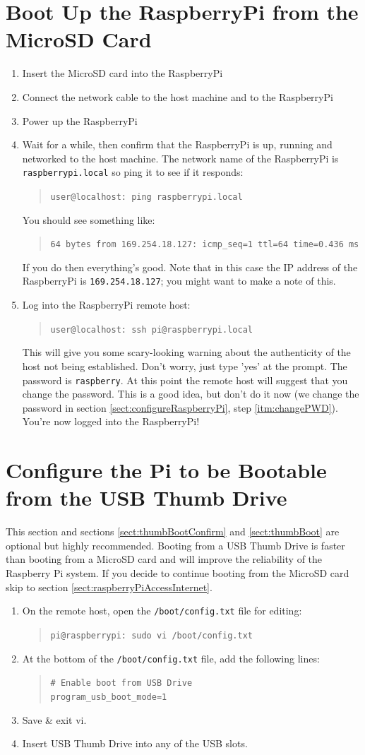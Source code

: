 \documentclass[11pt,oneside]{article}
\makeatletter
\newcommand{\localCommand}[1]{\begin{quote} \texttt{user@localhost: #1} \end{quote}}
\newcommand{\remoteCommandBeforeRename}[1]{\begin{quote} \texttt{pi@raspberrypi: #1} \end{quote}}
\newcommand{\xtermPartialOutput}[1]{\begin{verse} \texttt{#1} \end{verse}}
\makeatother
\begin{document}
\section{Boot Up the RaspberryPi from the MicroSD Card} \label{sect:bootRPIFromMSD}
\begin{enumerate}
	\item Insert the MicroSD card into the RaspberryPi
	\item Connect the network cable to the host machine and to the RaspberryPi
	\item Power up the RaspberryPi
	\item \label{itm:pingPISSDCard} Wait for a while, then confirm that the RaspberryPi is up, running and networked to the host machine.  The network name of the RaspberryPi
	is \texttt{raspberrypi.local} so ping it to see if it responds: \localCommand{ping raspberrypi.local}
	You should see something like:
	\xtermPartialOutput{64 bytes from 169.254.18.127: icmp\_seq=1 ttl=64 time=0.436 ms}
	If you do then everything's good.  Note that in this case the IP address of the RaspberryPi is \texttt{169.254.18.127}; you might want to make a note of this.
	\item Log into the RaspberryPi remote host: \localCommand{ssh pi@raspberrypi.local}
	This will give you some scary-looking warning about the authenticity of the host not being established.  Don't worry, just type 'yes' at the prompt.  The password is \texttt{raspberry}.
	At this point the remote host will suggest that you change the password.  This is a good idea, but don't do it now (we change the password in section \ref{sect:configureRaspberryPi},
	step \ref{itm:changePWD}).  You're now logged into the RaspberryPi!
\end{enumerate}

\section{Configure the Pi to be Bootable from the USB Thumb Drive} \label{sect:thumbBootConfigure}
This section and sections \ref{sect:thumbBootConfirm} and \ref{sect:thumbBoot} are optional but highly recommended.  Booting from a USB Thumb Drive is faster than booting from a MicroSD card
and will improve the reliability of the Raspberry Pi system. If you decide to continue booting from the MicroSD card skip to section \ref{sect:raspberryPiAccessInternet}.
\begin{enumerate}
	\item On the remote host, open the \texttt{/boot/config.txt} file for editing: \remoteCommandBeforeRename{sudo vi /boot/config.txt}
	\item At the bottom of the \texttt{/boot/config.txt} file, add the following lines: \xtermPartialOutput{\# Enable boot from USB Drive\\ program\_usb\_boot\_mode=1}
	\item Save \& exit vi.
	\item Insert USB Thumb Drive into any of the USB slots.
\end{enumerate}
\end{document}
